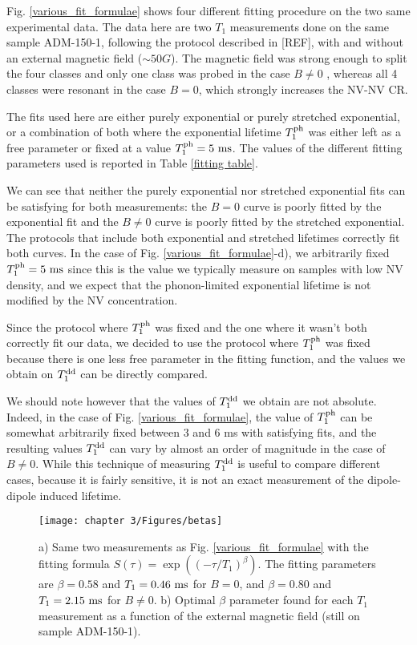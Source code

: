 \documentclass[a4paper,11pt]{report}
\begin{document}
\begin{refsection}
Fig. \ref{various_fit_formulae} shows four different fitting procedure on the two same experimental data. The data here are two $T_1$ measurements done on the same sample ADM-150-1, following the protocol described in [REF], with and without an external magnetic field ($\sim 50 G$). The magnetic field was strong enough to split the four classes and only one class was probed in the case $B\neq0$ , whereas all 4 classes were resonant in the case $B=0$, which strongly increases the NV-NV CR. 

The fits used here are either purely exponential or purely stretched exponential, or a combination of both where the exponential lifetime $T_1^{\rm ph}$ was either left as a free parameter or fixed at a value $T_1^{\rm ph}=5\ \rm ms$. The values of the different fitting parameters used is reported in Table \ref{fitting table}.

We can see that neither the purely exponential nor stretched exponential fits can be satisfying for both measurements: the $B=0$ curve is poorly fitted by the exponential fit and the $B \neq 0$ curve is poorly fitted by the stretched exponential. The protocols that include both exponential and stretched lifetimes correctly fit both curves. In the case of Fig. \ref{various_fit_formulae}-d), we arbitrarily fixed $T_1^{\rm ph}=5\ \rm ms$ since this is the value we typically measure on samples with low NV density, and we expect that the phonon-limited exponential lifetime is not modified by the NV concentration.

Since the protocol where $T_1^{\rm ph}$ was fixed and the one where it wasn't both correctly fit our data, we decided to use the protocol where $T_1^{\rm ph}$ was fixed because there is one less free parameter in the fitting function, and the values we obtain on $T_1^{\rm dd}$ can be directly compared. 

We should note however that the values of $T_1^{\rm dd}$ we obtain are not absolute. Indeed, in the case of Fig. \ref{various_fit_formulae}, the value of $T_1^{\rm ph}$ can be somewhat arbitrarily fixed between 3 and 6 ms with satisfying fits, and the resulting values $T_1^{\rm dd}$ can vary by almost an order of magnitude in the case of $B\neq0$. While this technique of measuring $T_1^{\rm dd}$ is useful to compare different cases, because it is fairly sensitive, it is not an exact measurement of the dipole-dipole induced lifetime.

\begin{figure}[h]
\centering
\texttt{[image: chapter 3/Figures/betas]}
\caption{a) Same two measurements as Fig. \ref{various_fit_formulae} with the fitting formula $S(\tau)=\exp ((-\tau/T_1)^{\beta})$. The fitting parameters are $\beta=0.58$ and $T_1=0.46\ \rm ms$ for $B=0$, and $\beta=0.80$ and $T_1=2.15\ \rm ms$ for $B\neq0$. b) Optimal $\beta$ parameter found for each $T_1$ measurement as a function of the external magnetic field (still on sample ADM-150-1).}
\label{betas}
\end{figure}


\end{refsection}
\end{document}

